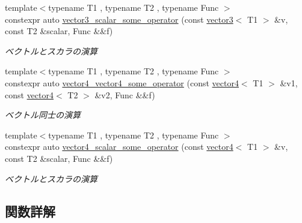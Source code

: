 \begin{DoxyCompactItemize}
{\footnotesize template$<$typename T1 , typename T2 , typename Func $>$ }\\constexpr auto \mbox{\hyperlink{namespacesaki_1_1details_a66b715797dcf04fae99e5cd60ea82cb3}{vector3\+\_\+scalar\+\_\+some\+\_\+operator}} (const \mbox{\hyperlink{classsaki_1_1vector3}{vector3}}$<$ T1 $>$ \&v, const T2 \&scalar, Func \&\&f)
\begin{DoxyCompactList}\small\item\em ベクトルとスカラの演算 \end{DoxyCompactList}\item 
{\footnotesize template$<$typename T1 , typename T2 , typename Func $>$ }\\constexpr auto \mbox{\hyperlink{namespacesaki_1_1details_a059dd5f75d9b1f557f4125e09c15d16c}{vector4\+\_\+vector4\+\_\+some\+\_\+operator}} (const \mbox{\hyperlink{classsaki_1_1vector4}{vector4}}$<$ T1 $>$ \&v1, const \mbox{\hyperlink{classsaki_1_1vector4}{vector4}}$<$ T2 $>$ \&v2, Func \&\&f)
\begin{DoxyCompactList}\small\item\em ベクトル同士の演算 \end{DoxyCompactList}\item 
{\footnotesize template$<$typename T1 , typename T2 , typename Func $>$ }\\constexpr auto \mbox{\hyperlink{namespacesaki_1_1details_abda7a9b7cd977b6a1e866891e695a60a}{vector4\+\_\+scalar\+\_\+some\+\_\+operator}} (const \mbox{\hyperlink{classsaki_1_1vector4}{vector4}}$<$ T1 $>$ \&v, const T2 \&scalar, Func \&\&f)
\begin{DoxyCompactList}\small\item\em ベクトルとスカラの演算 \end{DoxyCompactList}\end{DoxyCompactItemize}


\subsection{関数詳解}
\mbox{\label{namespacesaki_1_1details_a95cd387e134b1b940cde0b171926e01e}} 
